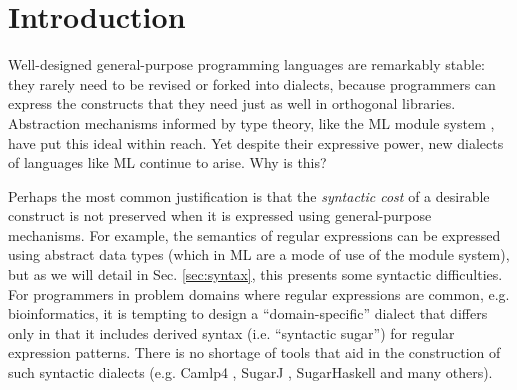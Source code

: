 \vspace{-25pt}
\section{Introduction}\label{motivation}
Well-designed general-purpose programming languages are remarkably stable: they rarely need to be revised or forked into dialects, because programmers can express the constructs that they need just as well in orthogonal libraries. %
Abstraction mechanisms informed by type theory, like  the ML module system \cite{MacQueen:1984:MSM:800055.802036}, have put this ideal within reach. 
Yet despite their expressive power, new {dialects} of languages like ML continue to arise. Why is this?

Perhaps the most common justification is that the \emph{syntactic cost} of a desirable construct is not  preserved when it is expressed using general-purpose mechanisms. %
For example, the semantics of regular expressions can be expressed using abstract data types (which in ML are a mode of use of the module system), but as we will detail in Sec. \ref{sec:syntax}, this presents some syntactic difficulties. For programmers in problem domains  where regular expressions are common, e.g. bioinformatics, it is tempting to design a ``domain-specific'' dialect that differs only in that it includes derived syntax (i.e. ``syntactic sugar'') for regular expression patterns. There is no shortage of tools that aid in the construction of such syntactic dialects (e.g. Camlp4 \cite{ocaml-manual}, SugarJ \cite{erdweg2011sugarj}, SugarHaskell \cite{erdweg2012layout} and many others).%

